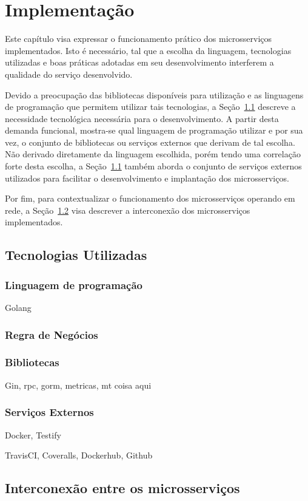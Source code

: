 \chapter{Implementação}
\label{cap5}

Este capítulo visa expressar o funcionamento prático dos microsserviços implementados.
%
Isto é necessário, tal que a escolha da linguagem, tecnologias utilizadas e boas práticas adotadas em seu desenvolvimento interferem a qualidade do serviço desenvolvido.

Devido a preocupação das bibliotecas disponíveis para utilização e as linguagens de programação que permitem utilizar tais tecnologias,
a Seção~\ref{sec:tecnologias} descreve a necessidade tecnológica necessária para o desenvolvimento. A partir desta demanda funcional, mostra-se qual linguagem de programação utilizar e por sua vez, o conjunto de bibliotecas ou serviços externos que derivam de tal escolha.
%
Não derivado diretamente da linguagem escolhida, porém tendo uma correlação forte desta escolha, a Seção~\ref{sec:tecnologias} também aborda o conjunto de serviços externos utilizados para facilitar o desenvolvimento e implantação dos microsserviços.

Por fim, para contextualizar o funcionamento dos microsserviços operando em rede, a Seção~\ref{sec:interconexao} visa descrever a interconexão dos microsserviços implementados.

\section{Tecnologias Utilizadas}
\label{sec:tecnologias}

\subsection{Linguagem de programação}

Golang

\subsection{Regra de Negócios}

\subsection{Bibliotecas}

Gin, \ac{rpc}, gorm, metricas, mt coisa aqui

\subsection{Serviços Externos}

Docker, Testify

TravisCI, Coveralls, Dockerhub, Github

\section{Interconexão entre os microsserviços}
\label{sec:interconexao}
